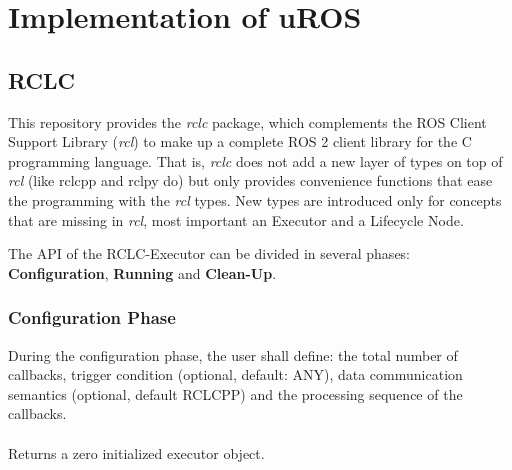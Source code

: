 \chapter{Implementation of uROS}
\section{RCLC}
This repository provides the \textit{rclc} package, which complements the ROS Client Support Library (\textit{rcl}) to make up a complete ROS 2 client library for the C programming language. That is, \textit{rclc} does not add a new layer of types on top of \textit{rcl} (like rclcpp and rclpy do) but only provides convenience functions that ease the programming with the \textit{rcl} types. New types are introduced only for concepts that are missing in \textit{rcl}, most important an Executor and a Lifecycle Node.

The API of the RCLC-Executor can be divided in several phases: \textbf{Configuration}, \textbf{Running} and \textbf{Clean-Up}.

\subsection{Configuration Phase}
During the configuration phase, the user shall define: the total number of callbacks, trigger condition (optional, default: ANY), data communication semantics (optional, default RCLCPP) and the processing sequence of the callbacks.
\subsubsection{}
Returns a zero initialized executor object.

